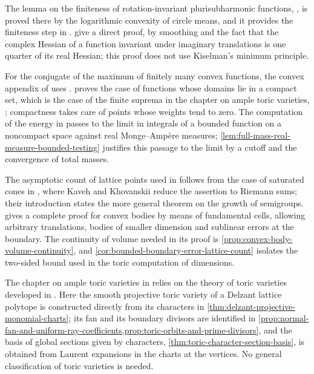 The lemma on the finiteness of rotation-invariant plurisubharmonic functions, \cite[Lemma 1.2.1]{XiaSampleBook}, is proved there by the logarithmic convexity of circle means, and it provides the finiteness step in \cite[Lemma~5.2.1]{XiaSampleBook}.  give a direct proof, by smoothing and the fact that the complex Hessian of a function invariant under imaginary translations is one quarter of its real Hessian; this proof does not use Kiselman's minimum principle.

For the conjugate of the maximum of finitely many convex functions, the convex appendix of \cite{XiaSampleBook} uses \cite[Theorem 16.5]{Roc70}.  proves the case of functions whose domains lie in a compact set, which is the case of the finite suprema in the chapter on ample toric varieties, \cite[Proposition 5.2.4]{XiaSampleBook}; compactness takes care of points whose weights tend to zero. The computation of the energy in \cite[Proposition 5.2.9, Step 1]{XiaSampleBook} passes to the limit in integrals of a bounded function on a noncompact space against real Monge--Amp\`ere measures; \cref{lem:full-mass-real-measure-bounded-testing} justifies this passage to the limit by a cutoff and the convergence of total masses.

The asymptotic count of lattice points used in \cite[Section~5.2]{XiaSampleBook} follows from the case of saturated cones in \cite[Theorem 1.15]{KK12}, where Kaveh and Khovanskii reduce the assertion to Riemann sums; their introduction states the more general theorem on the growth of semigroups.  gives a complete proof for convex bodies by means of fundamental cells, allowing arbitrary translations, bodies of smaller dimension and sublinear errors at the boundary. The continuity of volume needed in its proof is \cref{prop:convex-body-volume-continuity}, and \cref{cor:bounded-boundary-error-lattice-count} isolates the two-sided bound used in the toric computation of dimensions.

The chapter on ample toric varieties in \cite{XiaSampleBook} relies on the theory of toric varieties developed in \cite{CLS11}. Here the smooth projective toric variety of a Delzant lattice polytope is constructed directly from its characters in \cref{thm:delzant-projective-monomial-charts}; its fan and its boundary divisors are identified in \cref{prop:normal-fan-and-uniform-ray-coefficients,prop:toric-orbits-and-prime-divisors}, and the basis of global sections given by characters, \cref{thm:toric-character-section-basis}, is obtained from Laurent expansions in the charts at the vertices. No general classification of toric varieties is needed.

